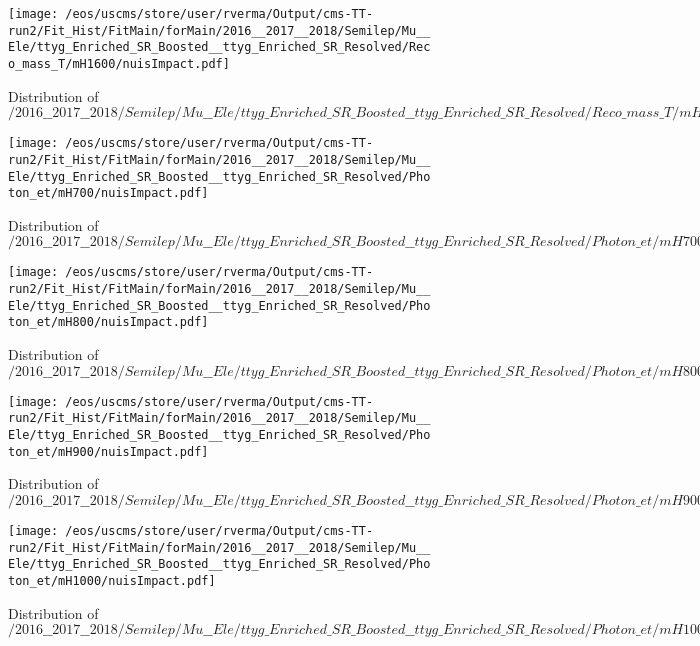 \begin{figure}
\centering
\texttt{[image: /eos/uscms/store/user/rverma/Output/cms-TT-run2/Fit\_Hist/FitMain/forMain/2016\_\_2017\_\_2018/Semilep/Mu\_\_Ele/ttyg\_Enriched\_SR\_Boosted\_\_ttyg\_Enriched\_SR\_Resolved/Reco\_mass\_T/mH1600/nuisImpact.pdf]}
\caption{Distribution of $/2016\_\_2017\_\_2018/Semilep/Mu\_\_Ele/ttyg\_Enriched\_SR\_Boosted\_\_ttyg\_Enriched\_SR\_Resolved/Reco\_mass\_T/mH1600/nuisImpact.pdf$}
\end{figure}

\begin{figure}
\centering
\texttt{[image: /eos/uscms/store/user/rverma/Output/cms-TT-run2/Fit\_Hist/FitMain/forMain/2016\_\_2017\_\_2018/Semilep/Mu\_\_Ele/ttyg\_Enriched\_SR\_Boosted\_\_ttyg\_Enriched\_SR\_Resolved/Photon\_et/mH700/nuisImpact.pdf]}
\caption{Distribution of $/2016\_\_2017\_\_2018/Semilep/Mu\_\_Ele/ttyg\_Enriched\_SR\_Boosted\_\_ttyg\_Enriched\_SR\_Resolved/Photon\_et/mH700/nuisImpact.pdf$}
\end{figure}

\begin{figure}
\centering
\texttt{[image: /eos/uscms/store/user/rverma/Output/cms-TT-run2/Fit\_Hist/FitMain/forMain/2016\_\_2017\_\_2018/Semilep/Mu\_\_Ele/ttyg\_Enriched\_SR\_Boosted\_\_ttyg\_Enriched\_SR\_Resolved/Photon\_et/mH800/nuisImpact.pdf]}
\caption{Distribution of $/2016\_\_2017\_\_2018/Semilep/Mu\_\_Ele/ttyg\_Enriched\_SR\_Boosted\_\_ttyg\_Enriched\_SR\_Resolved/Photon\_et/mH800/nuisImpact.pdf$}
\end{figure}

\begin{figure}
\centering
\texttt{[image: /eos/uscms/store/user/rverma/Output/cms-TT-run2/Fit\_Hist/FitMain/forMain/2016\_\_2017\_\_2018/Semilep/Mu\_\_Ele/ttyg\_Enriched\_SR\_Boosted\_\_ttyg\_Enriched\_SR\_Resolved/Photon\_et/mH900/nuisImpact.pdf]}
\caption{Distribution of $/2016\_\_2017\_\_2018/Semilep/Mu\_\_Ele/ttyg\_Enriched\_SR\_Boosted\_\_ttyg\_Enriched\_SR\_Resolved/Photon\_et/mH900/nuisImpact.pdf$}
\end{figure}

\begin{figure}
\centering
\texttt{[image: /eos/uscms/store/user/rverma/Output/cms-TT-run2/Fit\_Hist/FitMain/forMain/2016\_\_2017\_\_2018/Semilep/Mu\_\_Ele/ttyg\_Enriched\_SR\_Boosted\_\_ttyg\_Enriched\_SR\_Resolved/Photon\_et/mH1000/nuisImpact.pdf]}
\caption{Distribution of $/2016\_\_2017\_\_2018/Semilep/Mu\_\_Ele/ttyg\_Enriched\_SR\_Boosted\_\_ttyg\_Enriched\_SR\_Resolved/Photon\_et/mH1000/nuisImpact.pdf$}
\end{figure}

